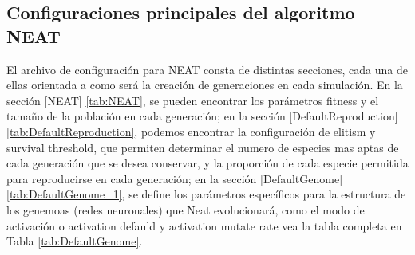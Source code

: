 \documentclass[lettersize, journal]{IEEEtran}
\begin{document}
\subsection{Configuraciones principales del algoritmo NEAT}
El archivo de configuración para NEAT consta de distintas secciones, cada una de ellas orientada a como será la creación de generaciones en cada simulación. En la sección [NEAT] \ref{tab:NEAT}, se pueden encontrar los parámetros fitness y el tamaño de la población en cada generación; en la sección [DefaultReproduction] \ref{tab:DefaultReproduction}, podemos encontrar la configuración de elitism y survival threshold, que permiten determinar el numero de especies mas aptas de cada generación que se desea conservar, y la proporción de cada especie permitida para reproducirse en cada generación; en la sección [DefaultGenome] \ref{tab:DefaultGenome_1}, se define los parámetros específicos para la estructura de los genemoas (redes neuronales) que Neat evolucionará, como el modo de activación o activation defauld y activation mutate rate vea la tabla completa en Tabla \ref{tab:DefaultGenome}.
\end{document}
